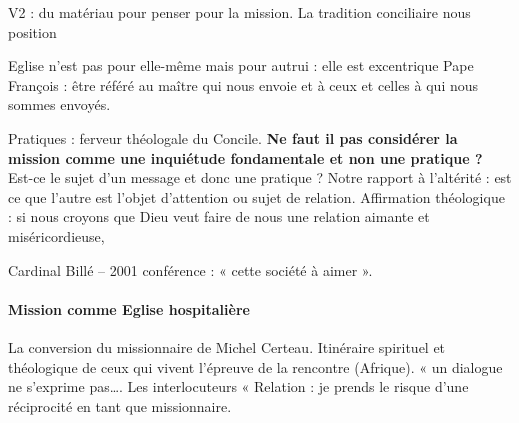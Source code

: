 \begin{Synthesis}
V2 : du matériau pour penser pour la mission. La tradition conciliaire nous position
\end{Synthesis}

Eglise n’est pas pour elle-même mais pour autrui : elle est excentrique
Pape François : être référé au maître qui nous envoie et à ceux et celles à qui nous sommes envoyés.

Pratiques : ferveur théologale du Concile. \textbf{Ne faut il pas considérer la mission comme une inquiétude fondamentale et non une pratique ? } Est-ce le sujet d’un message et donc une pratique ?
Notre rapport à l’altérité : est ce que l’autre est l’objet d’attention ou sujet de relation. Affirmation théologique : si nous croyons que Dieu veut faire de nous une relation aimante et miséricordieuse, 

Cardinal Billé – 2001 conférence : « cette société à aimer ». 

\paragraph{Mission comme Eglise hospitalière}
La conversion du missionnaire de Michel Certeau. Itinéraire spirituel et théologique de ceux qui vivent l’épreuve de la rencontre (Afrique). 
« un dialogue ne s’exprime pas…. Les interlocuteurs « 
Relation : je prends le risque d’une réciprocité en tant que missionnaire.  
